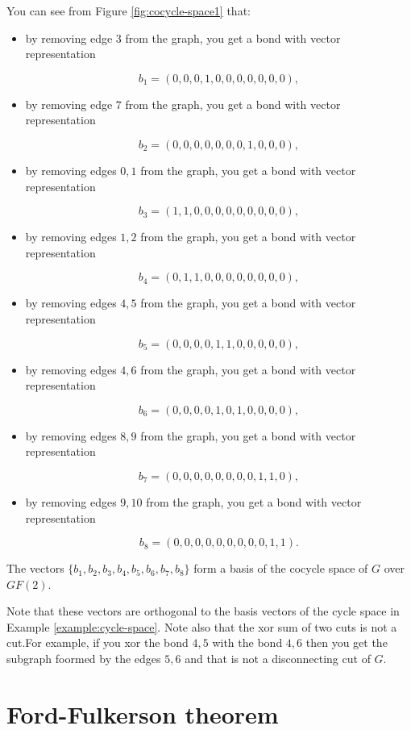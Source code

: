 \begin{example}
{You can see from Figure \ref{fig:cocycle-space1} that:

\begin{itemize}
\item
by removing edge $3$ from the graph, you get a bond with vector
representation

\[
b_1 = (0,0,0,1,0,0,0,0,0,0,0),
\]
\item
by removing edge $7$ from the graph, you get a bond with vector
representation

\[
b_2 = (0,0,0,0,0,0,0,1,0,0,0),
\]
\item
by removing edges $0,1$ from the graph, you get a bond with vector
representation

\[
b_3 = (1,1,0,0,0,0,0,0,0,0,0),
\]
\item
by removing edges $1,2$ from the graph, you get a bond with vector
representation

\[
b_4 = (0,1,1,0,0,0,0,0,0,0,0),
\]
\item
by removing edges $4,5$ from the graph, you get a bond with vector
representation

\[
b_5 = (0,0,0,0,1,1,0,0,0,0,0),
\]
\item
by removing edges $4,6$ from the graph, you get a bond with vector
representation

\[
b_6 = (0,0,0,0,1,0,1,0,0,0,0),
\]
\item
by removing edges $8,9$ from the graph, you get a bond with vector
representation

\[
b_7 = (0,0,0,0,0,0,0,0,1,1,0),
\]
\item
by removing edges $9,10$ from the graph, you get a bond with vector
representation

\[
b_8 = (0,0,0,0,0,0,0,0,0,1,1).
\]
\end{itemize}
The vectors $\{b_1,b_2,b_3,b_4,b_5,b_6,b_7,b_8\}$ form a basis of the 
cocycle space of $G$ over $GF(2)$. 

Note that these vectors are orthogonal to the basis vectors of
the cycle space in Example \ref{example:cycle-space}. Note also that
the xor sum of two cuts is not a cut.For example, if you xor the bond
$4,5$ with the bond $4,6$ then you get the subgraph foormed by the 
edges $5,6$ and that is not a disconnecting cut of $G$.
}
\end{example}




\section{Ford-Fulkerson theorem}

